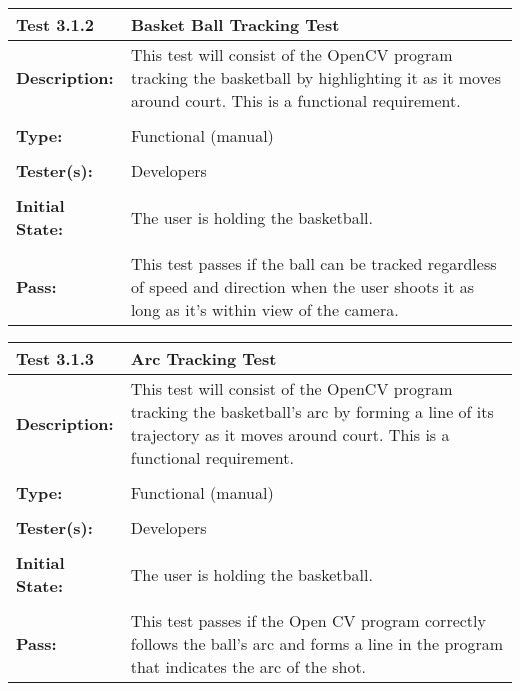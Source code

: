 \documentclass{article}
\begin{document}
\begin{tabularx}{\textwidth}{p{2cm}p{9cm}}
\toprule 
{\bf Test 3.1.2} & {\bf Basket Ball Tracking Test}\\
\midrule
\textbf{Description:} & This test will consist of the OpenCV program tracking the basketball by highlighting it as it moves around court. This is a functional requirement.\\[0.3\baselineskip]
                      &                     \\
\textbf{Type:} & Functional (manual)   \\[0.3\baselineskip]
                      &                     \\
\textbf{Tester(s):} & Developers \\[0.3\baselineskip]
                      &                     \\
\textbf{Initial State:} & The user is holding the basketball. \\[0.3\baselineskip]
                      &                     \\
\textbf{Pass:} & This test passes if the ball can be tracked regardless of speed and direction when the user shoots it as long as it's within view of the camera.  \\[0.3\baselineskip]
\bottomrule
\end{tabularx}



\begin{tabularx}{\textwidth}{p{2cm}p{9cm}}
\toprule 
{\bf Test 3.1.3} & {\bf Arc Tracking Test}\\
\midrule
\textbf{Description:} & This test will consist of the OpenCV program tracking the basketball's arc by forming a line of its trajectory as it moves around court. This is a functional requirement. \\[0.3\baselineskip]
                      &                     \\
\textbf{Type:} & Functional (manual)   \\[0.3\baselineskip]
                      &                     \\
\textbf{Tester(s):} & Developers \\[0.3\baselineskip]
                      &                     \\
\textbf{Initial State:} & The user is holding the basketball. \\[0.3\baselineskip]
                      &                     \\
\textbf{Pass:} & This test passes if the Open CV program correctly follows the ball's arc and forms a line in the program that indicates the arc of the shot.  \\[0.3\baselineskip]
\end{tabularx}
\end{document}
